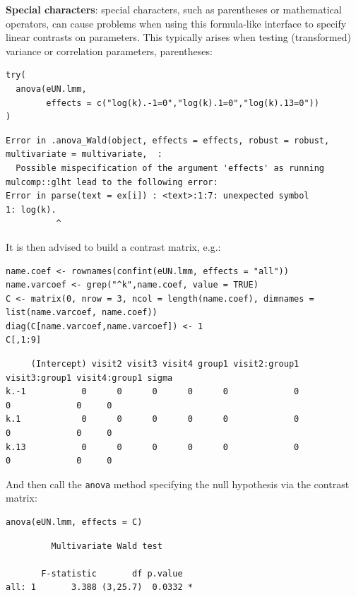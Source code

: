 \documentclass[12pt]{article}
\begin{document}
\textbf{Special characters}: special characters, such as parentheses or
mathematical operators, can cause problems when using this
formula-like interface to specify linear contrasts on parameters. This
typically arises when testing (transformed) variance or correlation parameters,
parentheses:
\lstset{language=r,label= ,caption= ,captionpos=b,numbers=none}
\begin{lstlisting}
try(
  anova(eUN.lmm,
        effects = c("log(k).-1=0","log(k).1=0","log(k).13=0"))
)
\end{lstlisting}

\begin{verbatim}
Error in .anova_Wald(object, effects = effects, robust = robust, multivariate = multivariate,  : 
  Possible mispecification of the argument 'effects' as running mulcomp::glht lead to the following error: 
Error in parse(text = ex[i]) : <text>:1:7: unexpected symbol
1: log(k).
          ^
\end{verbatim}


It is then advised to build a contrast matrix, e.g.:
\lstset{language=r,label= ,caption= ,captionpos=b,numbers=none}
\begin{lstlisting}
name.coef <- rownames(confint(eUN.lmm, effects = "all"))
name.varcoef <- grep("^k",name.coef, value = TRUE)
C <- matrix(0, nrow = 3, ncol = length(name.coef), dimnames = list(name.varcoef, name.coef))
diag(C[name.varcoef,name.varcoef]) <- 1
C[,1:9]
\end{lstlisting}

\begin{verbatim}
     (Intercept) visit2 visit3 visit4 group1 visit2:group1 visit3:group1 visit4:group1 sigma
k.-1           0      0      0      0      0             0             0             0     0
k.1            0      0      0      0      0             0             0             0     0
k.13           0      0      0      0      0             0             0             0     0
\end{verbatim}


And then call the \texttt{anova} method specifying the null hypothesis via the
contrast matrix:
\lstset{language=r,label= ,caption= ,captionpos=b,numbers=none}
\begin{lstlisting}
anova(eUN.lmm, effects = C)
\end{lstlisting}

\begin{verbatim}
	     Multivariate Wald test 

       F-statistic       df p.value  
all: 1       3.388 (3,25.7)  0.0332 *
\end{verbatim}
\end{document}
